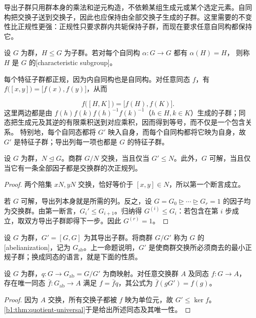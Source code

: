 \ProseParagraphBreak
导出子群只用群本身的乘法和逆元构造，不依赖某组生成元或某个选定元素。自同构把交换子送到交换子，因此也应保持由全部交换子生成的子群。这里需要的不变性比正规性更强：正规性只要求群内共轭保持子群，而现在要求任意自同构都保持它。

\begin{definition}\label{b1:def:characteristic-subgroup}
	设 \(G\) 为群，\(H\le G\) 为子群。若对每个自同构 \(\alpha:G\to G\) 都有 \(\alpha(H)=H\)， 则称 \(H\) 是 \(G\) 的[characteristic subgroup]。
\end{definition}

每个特征子群都正规，因为内自同构也是自同构。对任意同态 \(f\)，有 \(f\bigl([x,y]\bigr)=\bigl[f(x),f(y)\bigr]\)，从而

\begin{equation}\label{b1:eq:commutator-image}
	f\bigl([H,K]\bigr)=\bigl[f(H),f(K)\bigr].
\end{equation}
这里两边都是由 \(f(h)f(k)f(h)^{-1}f(k)^{-1}\)（\(h\in H,k\in K\)）生成的子群；同态把生成元及其逆的有限乘积送到对应乘积，因而得到等号，而不仅是一个包含关系。 特别地，每个自同态都将 \(G'\) 映入自身，而每个自同构都将它映为自身，故 \(G'\) 是特征子群；导出列每一项也都是 \(G\) 的特征子群。

\begin{proposition}[交换商群与可解性的判别]\label{b1:prop:derived-quotient}
	设 \(G\) 为群，\(N\trianglelefteq G\)。商群 \(G/N\) 交换，当且仅当 \(G'\le N\)。此外，\(G\) 可解，当且仅当它有一条全部因子都是交换群的次正规列。
\end{proposition}
\begin{proof}
	两个陪集 \(xN,yN\) 交换，恰好等价于 \([x,y]\in N\)，所以第一个断言成立。

	若 \(G\) 可解，导出列本身就是所需的列。反之，设 \(G=G_0\trianglerighteq\cdots\trianglerighteq G_r=1\) 的因子均为交换群。由第一断言，\(G_i'\le G_{i+1}\)。归纳得 \(G^{(i)}\le G_i\)：若包含在第 \(i\) 步成立，取双方导出子群即得下一步。因此 \(G^{(r)}=1\)。
\end{proof}

设 \(G\) 为群，\(G'=[G,G]\) 为其导出子群。将商群 \(G/G'\) 称为 \(G\) 的[abelianization]，记为 \(G_{\mathrm{ab}}\)。上一命题说明，\(G'\) 是使商群交换所必须商去的最小正规子群；换成同态的语言，就是下面的性质。

\begin{corollary}[交换化的泛性质]\label{b1:cor:abelianization-universal}
	设 \(G\) 为群，\(q:G\rightarrow G_{\mathrm{ab}}=G/G'\) 为商映射。对任意交换群 \(A\) 及同态 \(f:G\rightarrow A\)，存在唯一同态 \(\bar f:G_{\mathrm{ab}}\rightarrow A\) 满足 \(f=\bar f q\)，其公式为 \(\bar f(gG')=f(g)\)。
\end{corollary}
\begin{proof}
	因为 \(A\) 交换，所有交换子都被 \(f\) 映为单位元，故 \(G'\le\ker f\)。\cref{b1:thm:quotient-universal}于是给出所述同态及其唯一性。
\end{proof}

